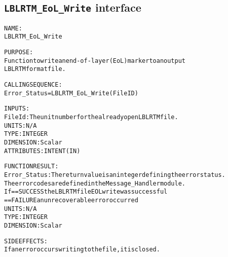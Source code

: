 \subsection{\texttt{LBLRTM\_EoL\_Write} interface}
  \label{sec:LBLRTM_EoL_Write_interface}
  \begin{alltt}
  NAME:
        LBLRTM_EoL_Write
 
  PURPOSE:
        Function to write an end-of-layer (EoL) marker to an output
        LBLRTM format file.
 
  CALLING SEQUENCE:
        Error_Status = LBLRTM_EoL_Write( FileID )
 
  INPUTS:
        FileId:        The unit number for the already open LBLRTM file.
                       UNITS:      N/A
                       TYPE:       INTEGER
                       DIMENSION:  Scalar
                       ATTRIBUTES: INTENT(IN)
 
  FUNCTION RESULT:
        Error_Status: The return value is an integer defining the error status.
                      The error codes are defined in the Message_Handler module.
                      If == SUCCESS the LBLRTM file EOL write was successful
                         == FAILURE an unrecoverable error occurred
                      UNITS:      N/A
                      TYPE:       INTEGER
                      DIMENSION:  Scalar
 
  SIDE EFFECTS:
        If an error occurs writing to the file, it is closed.
 
  \end{alltt}
